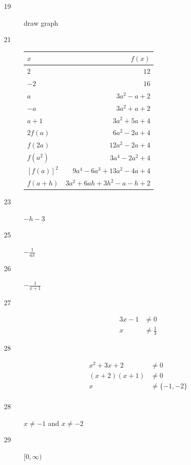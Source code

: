 \documentclass[letterpaper]{exam}
\begin{document}
\begin{description}
      \item[19] draw graph

      \item[21]
        \begin{tabular}[H]{lr}
          \toprule
          $x$ & $f(x)$ \\
          \midrule
          $2$          & $12$ \\
          $-2$         & $16$ \\
          $a$          & $3a^2 - a + 2$ \\
          $-a$         & $3a^2 + a + 2$ \\
          $a + 1$      & $3a^2 + 5a + 4$ \\
          $2 f(a)$     & $6a^2 - 2a + 4$ \\
          $f(2a)$      & $12a^2 - 2a + 4$ \\
          $f(a^2)$     & $3a^4 - 2a^2 + 4$ \\
          $[ f(a) ]^2$ & $9a^4 - 6a^3 + 13a^2 - 4a +  4$ \\
          $f(a + h)$   & $3a^2 + 6ah + 3h^2 - a - h + 2$ \\
        \end{tabular}

      \item[23] $-h - 3$

      \item[25] $-\frac{1}{a x}$

      \item[26] $-\frac{1}{x+1}$

      \item[27]
        \begin{align*}
          3x - 1 & \neq 0 \\
          x      & \neq \frac{1}{3}
        \end{align*}

      \item[28]
        \begin{align*}
          x^2 + 3x + 2    & \neq 0 \\
          (x + 2) (x + 1) & \neq 0 \\
          x               & \neq \{-1, -2\} \\
        \end{align*}

      \item[28] $x \neq -1$ and $x \neq -2$

      \item[29] $[0, \infty)$


\end{description}
\end{document}
